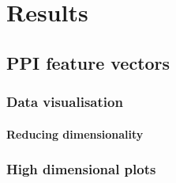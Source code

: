 \chapter{Results}
\label{results}



\section{PPI feature vectors}









\subsection{Data visualisation}

\subsubsection{Reducing dimensionality}


\subsection{High dimensional plots}

